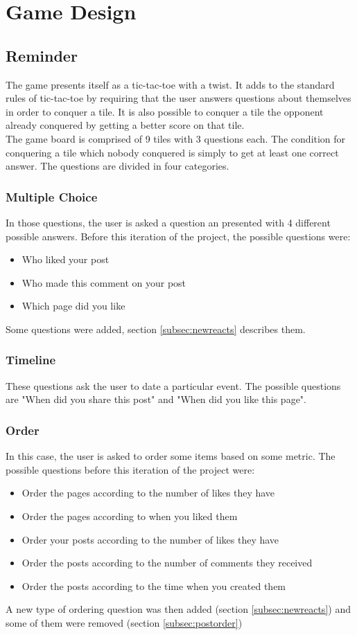 \chapter{Game Design}
\section{Reminder}
The game presents itself as a tic-tac-toe with a twist. It adds to the standard rules of tic-tac-toe by requiring that the user answers questions about themselves in order to conquer a tile. It is also possible to conquer a tile the opponent already conquered by getting a better score on that tile.\\
The game board is comprised of 9 tiles with 3 questions each. The condition for conquering a tile which nobody conquered is simply to get at least one correct answer. The questions are divided in four categories.
\subsection{Multiple Choice}
In those questions, the user is asked a question an presented with 4 different possible answers. Before this iteration of the project, the possible questions were:
\begin{itemize}
	\item Who liked your post
	\item Who made this comment on your post
	\item Which page did you like
\end{itemize}
Some questions were added, section \ref{subsec:newreacts} describes them.
\subsection{Timeline}
These questions ask the user to date a particular event. The possible questions are "When did you share this post" and "When did you like this page".
\subsection{Order}
In this case, the user is asked to order some items based on some metric. The possible questions before this iteration of the project were:
\begin{itemize}
	\item Order the pages according to the number of likes they have
	\item Order the pages according to when you liked them
	\item Order your posts according to the number of likes they have
	\item Order the posts according to the number of comments they received
	\item Order the posts according to the time when you created them
\end{itemize}
A new type of ordering question was then added (section \ref{subsec:newreacts}) and some of them were removed (section \ref{subsec:postorder})

